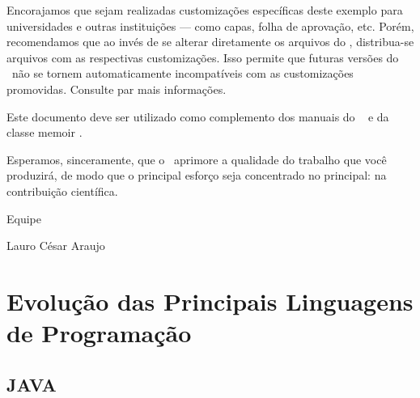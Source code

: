 \documentclass[
    12pt,               %
    openright,          %
    twoside,            %
    a4paper,            %
    brazil              %
    ]{abntex2}
\begin{document}
Encorajamos que sejam realizadas customizações específicas deste exemplo para
universidades e outras instituições --- como capas, folha de aprovação, etc.
Porém, recomendamos que ao invés de se alterar diretamente os arquivos do
\abnTeX, distribua-se arquivos com as respectivas customizações.
Isso permite que futuras versões do \abnTeX~não se tornem automaticamente
incompatíveis com as customizações promovidas. Consulte
 par mais informações.

Este documento deve ser utilizado como complemento dos manuais do \abnTeX\ 
\cite{abntex2classe,abntex2cite,abntex2cite-alf} e da classe \textsf{memoir}
\cite{memoir}. 

Esperamos, sinceramente, que o \abnTeX\ aprimore a qualidade do trabalho que
você produzirá, de modo que o principal esforço seja concentrado no principal:
na contribuição científica.

Equipe \abnTeX 

Lauro César Araujo


\part{Evolução das Principais Linguagens de Programação}

\chapter{JAVA}
\end{document}
